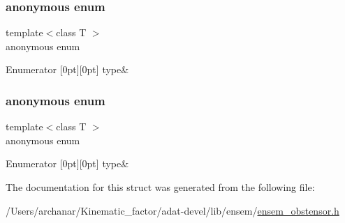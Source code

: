 \subsubsection{\texorpdfstring{anonymous enum}{anonymous enum}}
{\footnotesize\ttfamily template$<$class T $>$ \\
anonymous enum}

\begin{DoxyEnumFields}{Enumerator}
[0pt][0pt]{}\mbox{\label{structENSEM_1_1EnsbcIO_3_01OTensor_3_01T_01_4_01_4_a22aa8f56926e7c10361d1eddd182fd62a64eda6fb88be434d1c8331318f02a60e}} 
type&\\
\hline

\end{DoxyEnumFields}
\mbox{\label{structENSEM_1_1EnsbcIO_3_01OTensor_3_01T_01_4_01_4_a22aa8f56926e7c10361d1eddd182fd62}} 
\subsubsection{\texorpdfstring{anonymous enum}{anonymous enum}}
{\footnotesize\ttfamily template$<$class T $>$ \\
anonymous enum}

\begin{DoxyEnumFields}{Enumerator}
[0pt][0pt]{}\mbox{\label{structENSEM_1_1EnsbcIO_3_01OTensor_3_01T_01_4_01_4_a22aa8f56926e7c10361d1eddd182fd62a64eda6fb88be434d1c8331318f02a60e}} 
type&\\
\hline

\end{DoxyEnumFields}


The documentation for this struct was generated from the following file\+:\begin{DoxyCompactItemize}
\item 
/\+Users/archanar/\+Kinematic\+\_\+factor/adat-\/devel/lib/ensem/\mbox{\hyperlink{adat-devel_2lib_2ensem_2ensem__obstensor_8h}{ensem\+\_\+obstensor.\+h}}\end{DoxyCompactItemize}
